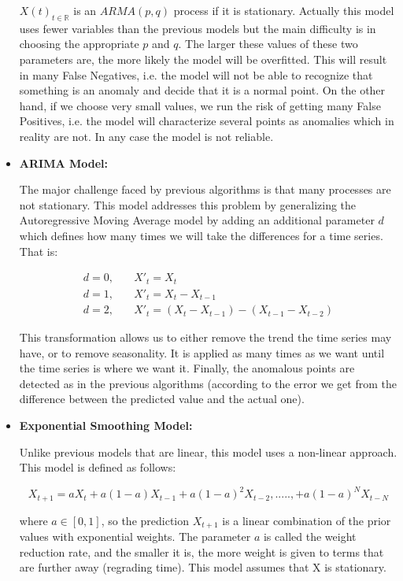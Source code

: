 \documentclass[a4paper,12pt]{report}
\theoremstyle{definitionNODot}
\begin{document}
\begin{itemize}
		$X(t)_{t\in\mathbb{R}}$ is an $ARMA(p,q)$ process if it is stationary. Actually this model uses fewer variables than the previous models but the main difficulty is in choosing the appropriate $p$ and $q$. The larger these values of these two parameters are, the more likely the model will be overfitted. This will result in many False Negatives, i.e. the model will not be able to recognize that something is an anomaly and decide that it is a normal point. On the other hand, if we choose very small values, we run the risk of getting many False Positives, i.e. the model will characterize several points as anomalies which in reality are not. In any case the model is not reliable.
		
		\item \textbf{ARIMA Model:}
		
		The major challenge faced by previous algorithms is that many processes are not stationary. This model addresses this problem by generalizing the Autoregressive Moving Average model by adding an additional parameter $d$ which defines how many times we will take the differences for a time series. That is:
		
		\begin{align*}
			d=0, & \quad X'_t = X_t \\
			d=1, & \quad X'_t = X_t-X_{t-1} \\ 
			d=2, & \quad X'_t = (X_t - X_{t-1}) - (X_{t-1} - X_{t-2})
		\end{align*}
		
		This transformation allows us to either remove the trend the time series may have, or to remove seasonality. It is applied as many times as we want until the time series is where we want it. Finally, the anomalous points are detected as in the previous algorithms (according to the error we get from the difference between the predicted value and the actual one).
		
		\item \textbf{Exponential Smoothing Model:}
		
		Unlike previous models that are linear, this model uses a non-linear approach. This model is defined as follows:
		
		$$ X_{t+1} = aX_t + a(1-a)X_{t-1} + a(1-a)^2X_{t-2},.....,+a(1-a)^NX_{t-N} $$
		
		where $a\in[0,1]$, so the prediction $X_{t+1}$ is a linear combination of the prior values with exponential weights. The parameter $a$ is called the weight reduction rate, and the smaller it is, the more weight is given to terms that are further away (regrading time). This model assumes that X is stationary.
		

\end{itemize}
\end{document}
